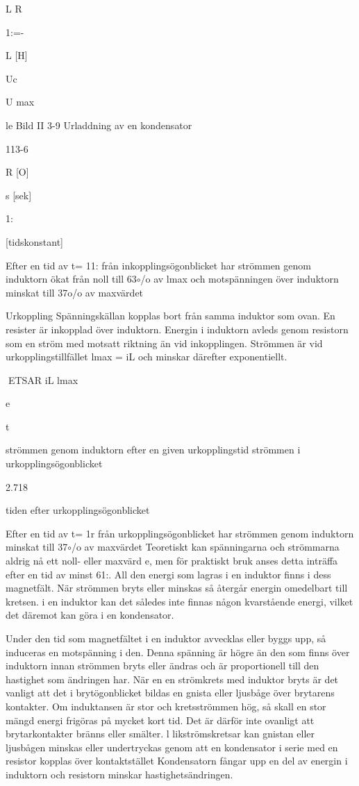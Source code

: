 \documentclass[a4paper,twoside,twocolumn,openright]{book}
\begin{document}
{{{{L
R

1:=-

L [H]

Uc

U max

le
Bild II 3-9 Urladdning av en kondensator

113-6

R [O]

s [sek]

1:

[tidskonstant]

Efter en tid av t= 11: från inkopplingsögonblicket har strömmen genom induktorn
ökat från noll till 63$\circ$/o av lmax och motspänningen över induktorn minskat till 37o/o
av maxvärdet

Urkoppling
Spänningskällan kopplas bort från samma
induktor som ovan. En resister är inkopplad
över induktorn. Energin i induktorn avleds
genom resistorn som en ström med motsatt
riktning än vid inkopplingen. Strömmen är
vid urkopplingstillfället lmax = iL och minskar
därefter exponentiellt.

ETSAR
iL
lmax

e

t

strömmen genom induktorn efter en
given urkopplingstid
strömmen i urkopplingsögonblicket

2.718

tiden efter urkopplingsögonblicket

Efter en tid av t= 1r från urkopplingsögonblicket har strömmen genom induktorn
minskat till 37$\circ$/o av maxvärdet
Teoretiskt kan spänningarna och strömmarna aldrig nå ett noll- eller maxvärd e, men
för praktiskt bruk anses detta inträffa efter en
tid av minst 61:.
All den energi som lagras i en induktor
finns i dess magnetfält. När strömmen bryts
eller minskas så återgår energin omedelbart
till kretsen. i en induktor kan det således inte
finnas någon kvarstående energi, vilket det
däremot kan göra i en kondensator.

Under den tid som magnetfältet i en induktor avvecklas eller byggs upp, så induceras en motspänning i den. Denna spänning
är högre än den som finns över induktorn
innan strömmen bryts eller ändras och är
proportionell till den hastighet som ändringen har. När en en strömkrets med induktor
bryts är det vanligt att det i brytögonblicket
bildas en gnista eller ljusbåge över brytarens
kontakter.
Om induktansen är stor och kretsströmmen hög, så skall en stor mängd energi
frigöras på mycket kort tid. Det är därför inte
ovanligt att brytarkontakter bränns eller smälter. l likströmskretsar kan gnistan eller ljusbågen minskas eller undertryckas genom att
en kondensator i serie med en resistor kopplas över kontaktstället Kondensatorn fångar
upp en del av energin i induktorn och resistorn minskar hastighetsändringen.

}}}}
\end{document}
